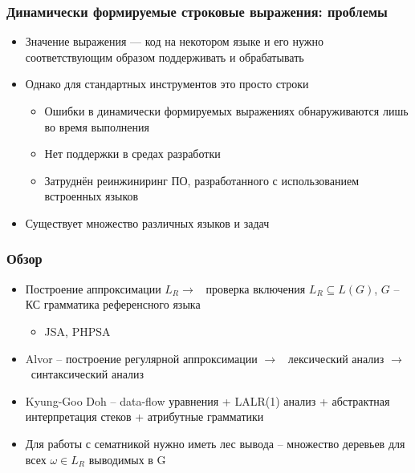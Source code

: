 \documentclass{beamer}
\begin{document}
\begin{frame}
    \transwipe[direction=90]
    \frametitle{Динамически формируемые строковые выражения: проблемы}
    \begin{itemize}
        \item Значение выражения --- код на некотором языке и его нужно соответствующим образом поддерживать и обрабатывать
        \item Однако для стандартных инструментов это просто строки
        \begin{itemize}
            \item Ошибки в динамически формируемых выражениях обнаруживаются лишь во время выполнения
            \item Нет поддержки в средах разработки
            \item Затруднён реинжиниринг ПО, разработанного с использованием встроенных языков                
        \end{itemize}
        \item Существует множество различных языков и задач
    \end{itemize}
\end{frame}

\begin{frame}
    \transwipe[direction=90]
    \frametitle{Обзор}
    \begin{itemize}
        \item Построение аппроксимации $L_R \rightarrow $ \ проверка включения $L_{R} \subseteq L(G)$, $G$ -- КС грамматика референсного языка 
        \begin{itemize}
            \item JSA, PHPSA
        \end{itemize}
        \item Alvor -- построение регулярной аппроксимации  $ \rightarrow $ \ лексический анализ $ \rightarrow $ \ синтаксический анализ
        \item Kyung-Goo Doh -- data-flow уравнения + LALR(1) анализ + абстрактная интерпретация стеков + атрибутные грамматики
        \item Для работы с сематникой нужно иметь лес вывода -- множество деревьев для всех $\omega \in L_R$ выводимых в G
    \end{itemize}
\end{frame}
\end{document}
